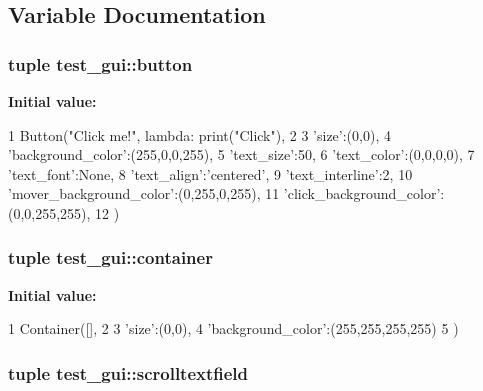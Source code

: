 \subsection{\-Variable \-Documentation}
\hypertarget{namespacetest__gui_a0f9afb2a654d1b9f5b8a0571e0873b96}{
\subsubsection[{button}]{\setlength{\rightskip}{0pt plus 5cm}tuple test\-\_\-gui\-::button}}\label{namespacetest__gui_a0f9afb2a654d1b9f5b8a0571e0873b96}
{\bfseries \-Initial value\-:}
\begin{DoxyCode}
1 Button("Click me!", lambda: print("Click"),
2                 {
3                     'size':(0,0),
4                     'background_color':(255,0,0,255),
5                     'text_size':50,
6                     'text_color':(0,0,0,0),
7                     'text_font':None,
8                     'text_align':'centered',
9                     'text_interline':2,
10                     'mover_background_color':(0,255,0,255),
11                     'click_background_color':(0,0,255,255),
12                 })
\end{DoxyCode}
\hypertarget{namespacetest__gui_a2ffe73c150ef1e3d6bb8b013dbdc2e37}{
\subsubsection[{container}]{\setlength{\rightskip}{0pt plus 5cm}tuple test\-\_\-gui\-::container}}\label{namespacetest__gui_a2ffe73c150ef1e3d6bb8b013dbdc2e37}
{\bfseries \-Initial value\-:}
\begin{DoxyCode}
1 Container([],
2                       {
3                         'size':(0,0),
4                         'background_color':(255,255,255,255)
5                       })
\end{DoxyCode}
\hypertarget{namespacetest__gui_a0ad70a91d0ffc54ddb3862c1652314d8}{
\subsubsection[{scrolltextfield}]{\setlength{\rightskip}{0pt plus 5cm}tuple test\-\_\-gui\-::scrolltextfield}}\label{namespacetest__gui_a0ad70a91d0ffc54ddb3862c1652314d8}
